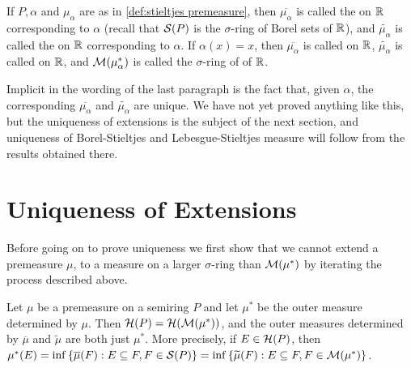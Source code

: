 \begin{definition}
If $P, \alpha$ and $\mu_\alpha$ are as in \ref{def:stieltjes premeasure}, then $\overline{\mu_\alpha}$ is called the  on $\mathbb{R}$ corresponding to $\alpha$ (recall that ${\cal S}(P)$ is the $\sigma$-ring of Borel sets of $\mathbb{R}$), and $\widetilde{\mu_\alpha}$ is called the  on $\mathbb{R}$ corresponding to $\alpha$. If $\alpha(x)=x$, then $\overline{\mu_\alpha}$ is called  on $\mathbb{R}$, $\widetilde{\mu_\alpha}$ is called  on $\mathbb{R}$, and ${\cal M}(\mu_\alpha^*)$ is called the $\sigma$-ring of  of $\mathbb{R}$.
\end{definition}

Implicit in the wording of the last paragraph is the fact that, given $\alpha$, the corresponding $\overline{\mu_\alpha}$ and $\widetilde{\mu_\alpha}$ are unique. We have not yet proved anything like this, but the uniqueness of extensions is the subject of the next section, and uniqueness of Borel-Stieltjes and Lebesgue-Stieltjes measure will follow from the results obtained there.

\section{Uniqueness of Extensions}

Before going on to prove uniqueness we first show that we cannot extend a premeasure $\mu$, to a measure on a larger $\sigma$-ring than ${\cal M}(\mu^*)$ by iterating the process described above.

\begin{proposition}\label{prop:repeated outer measure}
Let $\mu$ be a premeasure on a semiring $P$ and let $\mu^*$ be the outer measure determined by $\mu$. Then ${\cal H}(P)={\cal H}({\cal M}(\mu^*))$, and the outer measures determined by $\overline{\mu}$ and $\widetilde{\mu}$ are both just $\mu^*$. More precisely, if $E \in {\cal H}(P)$, then $\mu^*(E)=\inf \left\{\overline{\mu}(F):E\subseteq F,F\in {\cal S}(P)\right\}=\allowbreak\inf \left\{\widetilde{\mu}(F):E\subseteq F,F\in {\cal M}(\mu^*)\right\}$.
\end{proposition}

